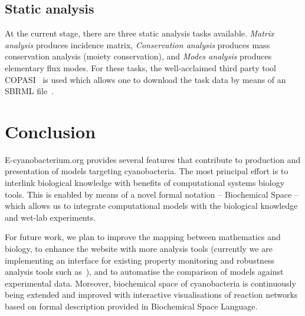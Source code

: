 \documentclass[runningheads]{llncs}
\begin{document}
\subsection{Static analysis}
\label{static}
At the current stage, there are three static analysis tasks available. \emph{Matrix analysis} produces incidence matrix, \emph{Conservation analysis} produces mass conservation analysis (moiety conservation), and \emph{Modes analysis} produces elementary flux modes. For these tasks, the well-acclaimed third party tool COPASI~\cite{copasi} is used which allows one to download the task data by means of an SBRML file~\cite{SBRML}.  

\section{Conclusion}
\enlargethispage*{6mm}

E-cyanobacterium.org provides several features that contribute to production and presentation of models targeting cyanobacteria. The most principal effort is to interlink biological knowledge with benefits of computational systems biology tools. This is enabled by means of a novel formal notation -- Biochemical Space -- which allows us to integrate computational models with the biological knowledge and wet-lab experiments.

For future work, we plan to improve the mapping between mathematics and biology, to enhance the website with more analysis tools (currently we are implementing an interface for existing property monitoring and robustness analysis tools such as~\cite{Rizk15062009}), and to automatise the comparison of models against experimental data. Moreover, biochemical space of cyanobacteria is continuously being extended and improved with interactive visualisations of reaction networks based on formal description provided in Biochemical Space Language.



\end{document}
